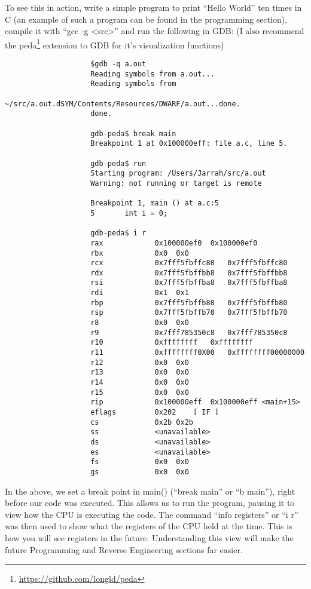 \documentclass[a4paper,11pt]{report}
\begin{document}
				To see this in action, write a simple program to print ``Hello World'' ten times in C (an example of such a program can be found in the programming section), %
				compile it with ``gcc -g <src>'' and run the following in GDB: (I also recommend the peda\footnote{\url{https://github.com/longld/peda}} extension to GDB for it's visualization functions)				
				\begin{verbatim}
					$gdb -q a.out
					Reading symbols from a.out...
					Reading symbols from 
					~/src/a.out.dSYM/Contents/Resources/DWARF/a.out...done.
					done.

					gdb-peda$ break main
					Breakpoint 1 at 0x100000eff: file a.c, line 5.

					gdb-peda$ run
					Starting program: /Users/Jarrah/src/a.out
					Warning: not running or target is remote

					Breakpoint 1, main () at a.c:5
					5		int i = 0;

					gdb-peda$ i r
					rax            0x100000ef0	0x100000ef0
					rbx            0x0	0x0
					rcx            0x7fff5fbffc80	0x7fff5fbffc80
					rdx            0x7fff5fbffbb8	0x7fff5fbffbb8
					rsi            0x7fff5fbffba8	0x7fff5fbffba8
					rdi            0x1	0x1
					rbp            0x7fff5fbffb80	0x7fff5fbffb80
					rsp            0x7fff5fbffb70	0x7fff5fbffb70
					r8             0x0	0x0
					r9             0x7fff785350c8	0x7fff785350c8
					r10            0xffffffff	0xffffffff
					r11            0xffffffff0X00	0xffffffff00000000
					r12            0x0	0x0
					r13            0x0	0x0
					r14            0x0	0x0
					r15            0x0	0x0
					rip            0x100000eff	0x100000eff <main+15>
					eflags         0x202	[ IF ]
					cs             0x2b	0x2b
					ss             <unavailable>
					ds             <unavailable>
					es             <unavailable>
					fs             0x0	0x0
					gs             0x0	0x0

				\end{verbatim}
				In the above, we set a break point in main() (``break main'' or ``b main''), right before our code was executed. 
				This allows us to run the program, pausing it to view how the CPU is executing the code. 
				The command ``info registers'' or ``i r'' was then used to show what the registers of the CPU held at the time.
				This is how you will see registers in the future. 
				Understanding this view will make the future Programming and Reverse Engineering sections far easier. %
\end{document}

